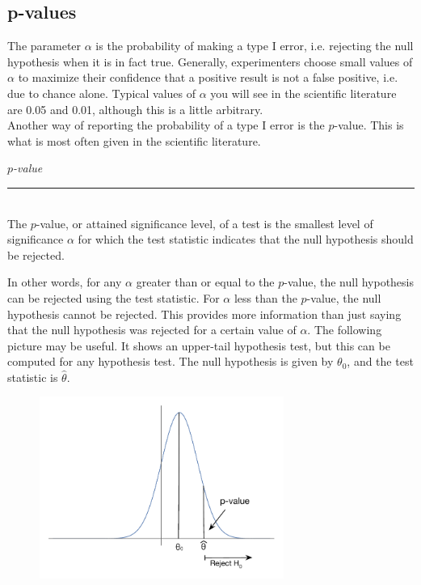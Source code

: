 \documentclass[12pt]{article}
\theoremstyle{definition}
\theoremstyle{remark}
\begin{document}
\subsection{p-values}
The parameter $\alpha$ is the probability of making a type I error, i.e. rejecting the null hypothesis when it is in fact true. Generally, experimenters choose small values of $\alpha$ to maximize their confidence that a positive result is not a false positive, i.e. due to chance alone. Typical values of $\alpha$ you will see in the scientific literature are 0.05 and 0.01, although this is a little arbitrary. \\

Another way of reporting the probability of a type I error is the $p$-value. This is what is most often given in the scientific literature.

\begin{framed}
\emph{$p$-value}\\
  \rule{\dimexpr{}\fboxrule}{.1pt} \\
The $p$-value, or attained significance level, of a test is the smallest level of significance $\alpha$ for which the test statistic indicates that the null hypothesis should be rejected.
\end{framed}

In other words, for any $\alpha$ greater than or equal to the $p$-value, the null hypothesis can be rejected using the test statistic. For $\alpha$ less than the $p$-value, the null hypothesis cannot be rejected. This provides more information than just saying that the null hypothesis was rejected for a certain value of $\alpha$. The following picture may be useful. It shows an upper-tail hypothesis test, but this can be computed for any hypothesis test. The null hypothesis is given by $\theta_0$, and the test statistic is $\hat{\theta}$.

\begin{figure}[H]
\centering
\includegraphics[width=8cm]{pvalues}
\end{figure}
\end{document}
